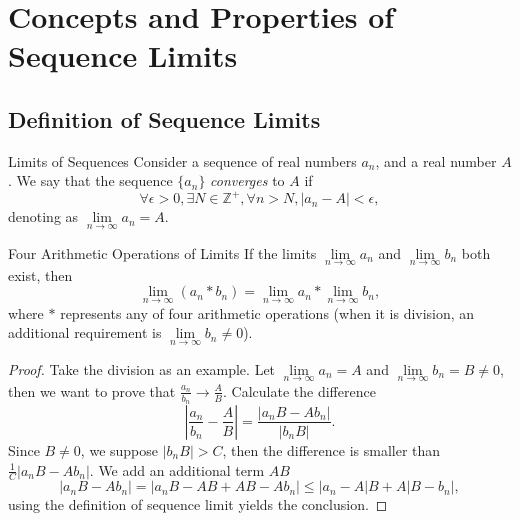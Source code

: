 
\section{Concepts and Properties of Sequence Limits}

\subsection{Definition of Sequence Limits}

\begin{definition}{Limits of Sequences}{}
  Consider a sequence of real numbers $a_n$, and a real number $A$.
  We say that the sequence $\{a_n\}$ \emph{converges} to $A$ if
  \begin{equation}
    \forall \epsilon > 0, \exists N \in \mathbb{Z}^+, \forall n > N, |a_n - A| < \epsilon,
  \end{equation}
  denoting as $\lim \limits _{n \rightarrow \infty}a_n = A$.
\end{definition}

\begin{proposition}{Four Arithmetic Operations of Limits}{}
  If the limits $\lim \limits _{n \rightarrow \infty} a_n$ and $\lim \limits _{n \rightarrow \infty} b_n$
  both exist, then
  \begin{equation}
    \lim \limits _{n \rightarrow \infty} (a_n \ast b_n) = \lim \limits _{n \rightarrow \infty} a_n \ast \lim \limits _{n \rightarrow \infty} b_n,
  \end{equation}
  where $\ast$ represents any of four arithmetic operations
  (when it is division, an additional requirement is $\lim \limits _{n
    \rightarrow \infty} b_n \neq 0$).
\end{proposition}

\begin{proof}
  Take the division as an example. Let $\lim \limits _{n \rightarrow \infty} a_n
  = A$ and $\lim \limits _{n \rightarrow \infty} b_n = B \neq 0$, then we
  want to prove that $\frac{a_n}{b_n} \rightarrow \frac{A}{B}$.
  Calculate the difference
  \begin{equation}
    \left|  \frac{a_n}{b_n} - \frac{A}{B}\right| = \frac{|a_nB - Ab_n|}{|b_n B|}.
  \end{equation}
  Since $B \neq 0$, we suppose $|b_n B| > C$,
  then the difference is smaller than $\frac{1}{C} |a_n B - Ab_n|$.
  We add an additional term $AB$
  \begin{equation}
    |a_n B - Ab_n| = |a_n B - AB + AB - Ab_n| \leq |a_n - A|B + A|B - b_n|,
  \end{equation}
  using the definition of sequence limit yields the conclusion.
\end{proof}

